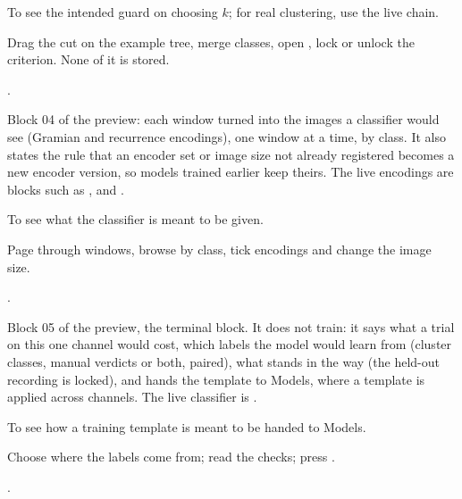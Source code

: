 
To see the intended guard on choosing \(k\); for real clustering, use the live chain.

Drag the cut on the example tree, merge classes, open , lock or unlock the criterion.
None of it is stored.

.

Block 04 of the preview: each window turned into the images a classifier would see (Gramian and
recurrence encodings), one window at a time, by class. It also states the rule that an encoder set
or image size not already registered becomes a new encoder version, so models trained earlier keep
theirs. The live encodings are blocks such as ,
 and .


To see what the classifier is meant to be given.

Page through windows, browse by class, tick encodings and change the image size.

.

Block 05 of the preview, the terminal block. It does not train: it says what a trial on this one
channel would cost, which labels the model would learn from (cluster classes, manual verdicts or
both, paired), what stands in the way (the held-out recording is locked), and hands the template to
Models, where a template is applied across channels. The live classifier is
.


To see how a training template is meant to be handed to Models.

Choose where the labels come from; read the checks; press .

.
